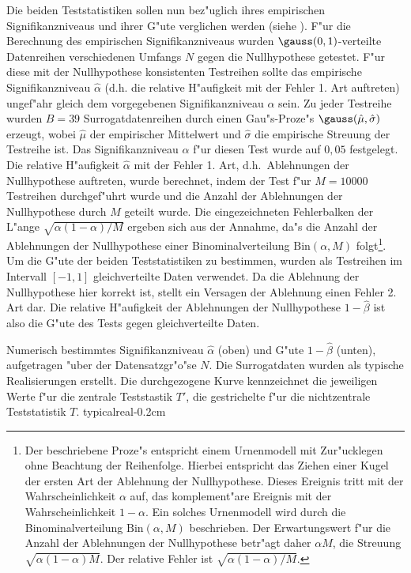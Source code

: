 Die beiden Teststatistiken sollen nun bez"uglich ihres empirischen Signifikanzniveaus und
ihrer G"ute verglichen werden (siehe ).  F"ur die Berechnung des
empirischen Signifikanzniveaus wurden $\gauss(0,1)$-verteilte Datenreihen verschiedenen Umfangs
$N$ gegen die Nullhypothese getestet. F"ur diese mit der Nullhypothese konsistenten
Testreihen sollte das empirische Signifikanzniveau $\hat\alpha$ (d.h. die relative H"aufigkeit mit der
Fehler 1. Art auftreten) ungef"ahr gleich dem vorgegebenen Signifikanzniveau $\alpha$
sein. Zu jeder Testreihe wurden $B=39$ Surrogatdatenreihen
durch einen Gau"s-Proze"s $\gauss(\hat\mu,\hat\sigma)$ erzeugt, wobei $\hat\mu$ 
der empirischer Mittelwert und $\hat\sigma$ die empirische Streuung der Testreihe ist.  Das Signifikanzniveau
$\alpha$ f"ur diesen Test wurde auf $0,05$ festgelegt. Die relative H"aufigkeit $\hat\alpha$ mit
der Fehler 1. Art, d.h.\ Ablehnungen der Nullhypothese auftreten, wurde berechnet, indem
der Test f"ur $M=10000$ Testreihen durchgef"uhrt wurde und die Anzahl der Ablehnungen der
Nullhypothese durch $M$ geteilt wurde. Die eingezeichneten Fehlerbalken der L"ange
$\sqrt{\alpha(1-\alpha)/M}$ ergeben sich aus der Annahme, da"s die Anzahl der Ablehnungen
der Nullhypothese einer Binominalverteilung $\mathrm{Bin}(\alpha,M)$ folgt\footnote{Der
  beschriebene Proze"s entspricht einem Urnenmodell mit Zur"ucklegen ohne Beachtung der
  Reihenfolge. Hierbei entspricht das Ziehen einer Kugel der ersten Art der Ablehnung der
  Nullhypothese. Dieses Ereignis tritt mit der Wahrscheinlichkeit $\alpha$ auf, das
  komplement"are Ereignis mit der Wahrscheinlichkeit $1-\alpha$. Ein solches Urnenmodell wird
  durch die Binominalverteilung $\mathrm{Bin}(\alpha,M)$ beschrieben. Der Erwartungswert
  f"ur die Anzahl der Ablehnungen der Nullhypothese betr"agt daher $\alpha M$, die
  Streuung $\sqrt{\alpha(1-\alpha)M}$. Der relative Fehler ist
  $\sqrt{\alpha(1-\alpha)/M}$.  }.  Um die G"ute der beiden Teststatistiken zu bestimmen,
wurden als Testreihen im Intervall $[-1,1]$ gleichverteilte Daten verwendet. Da die
Ablehnung der Nullhypothese hier korrekt ist, stellt ein Versagen der Ablehnung einen
Fehler 2. Art dar. Die relative H"aufigkeit der Ablehnungen der Nullhypothese
$1-\hat\beta$ ist also die G"ute des Tests gegen gleichverteilte Daten.

  {Numerisch
   bestimmtes Signifikanzniveau $\hat\alpha$ (oben) und G"ute $1-\hat\beta$ (unten),
   aufgetragen "uber der Datensatzgr"o"se $N$. Die Surrogatdaten wurden als typische
   Realisierungen erstellt. Die durchgezogene Kurve kennzeichnet die jeweiligen Werte f"ur
   die zentrale Teststastik $T'$, die gestrichelte f"ur die nichtzentrale Teststatistik $T$.  }
 {typicalreal}{-0.2cm}


